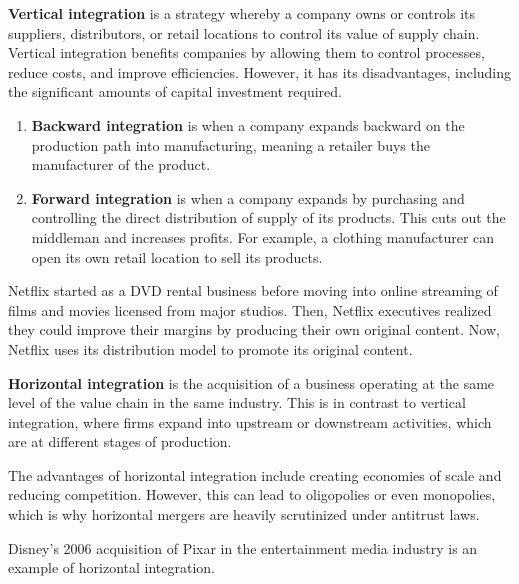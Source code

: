 \documentclass{article}
\begin{document}
    \begin{definition}
      \textbf{Vertical integration} is a strategy whereby a company owns or controls its suppliers, distributors, or retail locations to control its value of supply chain. Vertical integration benefits companies by allowing them to control processes, reduce costs, and improve efficiencies. However, it has its disadvantages, including the significant amounts of capital investment required. 
      \begin{enumerate}
        \item \textbf{Backward integration} is when a company expands backward on the production path into manufacturing, meaning a retailer buys the manufacturer of the product. 
        \item \textbf{Forward integration} is when a company expands by purchasing and controlling the direct distribution of supply of its products. This cuts out the middleman and increases profits. For example, a clothing manufacturer can open its own retail location to sell its products. 
      \end{enumerate}
    \end{definition}

    \begin{example}[Netflix]
      Netflix started as a DVD rental business before moving into online streaming of films and movies licensed from major studios. Then, Netflix executives realized they could improve their margins by producing their own original content. Now, Netflix uses its distribution model to promote its original content. 
    \end{example}

    \begin{definition}
      \textbf{Horizontal integration} is the acquisition of a business operating at the same level of the value chain in the same industry. This is in contrast to vertical integration, where firms expand into upstream or downstream activities, which are at different stages of production. 

      The advantages of horizontal integration include creating economies of scale and reducing competition. However, this can lead to oligopolies or even monopolies, which is why horizontal mergers are heavily scrutinized under antitrust laws. 
    \end{definition}

    \begin{example}
      Disney's 2006 acquisition of Pixar in the entertainment media industry is an example of horizontal integration. 
    \end{example}
\end{document}
